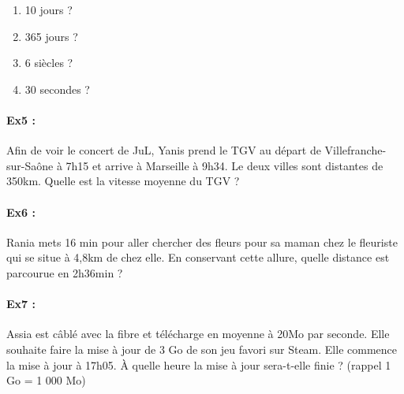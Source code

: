 \begin{multicols}{4}
  \begin{enumerate}
    \item[1.] 10 jours ?
    \item[2.] 365 jours ?
    \item[3.] 6 siècles ?
    \item[4.] 30 secondes ? 
  \end{enumerate}
\end{multicols}

\Pointilles[10]

\newpage

\paragraph{\textbf{Ex5 : }} Afin de voir le concert de JuL, Yanis prend le TGV au départ de Villefranche-sur-Saône à 7h15 et arrive à Marseille à 9h34. Le deux villes sont distantes de 350km. Quelle est la vitesse moyenne du TGV ?

\Pointilles[14]

\paragraph{\textbf{Ex6 : }} Rania mets 16 min pour aller chercher des fleurs pour sa maman chez le fleuriste qui se situe à 4,8km de chez elle. En conservant cette allure, quelle distance est parcourue en 2h36min ?

\Pointilles[14]

\paragraph{\textbf{Ex7 : }} Assia est câblé avec la fibre et télécharge en moyenne à 20Mo par seconde. Elle souhaite faire la mise à jour de 3 Go de son jeu favori sur Steam. Elle commence la mise à jour à 17h05. À quelle heure la mise à jour sera-t-elle finie ? (rappel 1 Go = 1 000 Mo)

\Pointilles[14]



